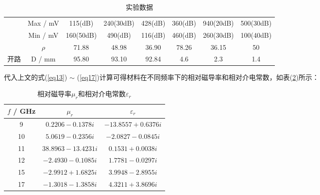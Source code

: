 \documentclass[a4paper]{article}
\begin{document}
\begin{table}[!h]
\begin{tabular}{|c|c|c|c|c|c|c|c|}
		                                                              & Max / mV                       & 115(dB)                       & 240(30dB)                     & 428(dB)                       & 360(dB)                       & 940(20dB)                     & 500(30dB)                   \\ \cline{2-8}
		                                                              & Min / mV                       & 160(50dB)                     & 490(dB)                       & 116(dB)                       & 460(dB)                       & 260(30dB)                     & 100(40dB)                   \\ \cline{2-8}
		                                                              & \cellcolor[HTML]{EFEFEF}$\rho$ & \cellcolor[HTML]{EFEFEF}71.88 & \cellcolor[HTML]{EFEFEF}48.98 & \cellcolor[HTML]{EFEFEF}36.90 & \cellcolor[HTML]{EFEFEF}78.26 & \cellcolor[HTML]{EFEFEF}36.15 & \cellcolor[HTML]{EFEFEF}50  \\ \cline{2-8}
		\multirow{-4}{*}{开路}                                        & \cellcolor[HTML]{EFEFEF}D / mm & \cellcolor[HTML]{EFEFEF}95.80 & \cellcolor[HTML]{EFEFEF}93.10 & \cellcolor[HTML]{EFEFEF}92.84 & \cellcolor[HTML]{EFEFEF}4.6   & \cellcolor[HTML]{EFEFEF}2.3   & \cellcolor[HTML]{EFEFEF}1.4 \\ \hline
	\end{tabular}
	\caption{实验数据}\label{table1:data}
\end{table}

代入上文的式(\ref{eq13}) $\sim$ (\ref{eq17})计算可得材料在不同频率下的相对磁导率和相对介电常数，如表(\ref{table2:mu_r and epsilon_r})所示：
\begin{table}[!h]
	\centering
	\begin{tabular}{|c|c|c|}
		\hline
		$f$ / GHz & $\mu_r$             & $\varepsilon_r$     \\ \hline
		9         & $0.2206-0.1378 i$   & $-13.8557+0.6376 i$ \\ \hline
		10        & $5.0619-0.2356 i$   & $-2.0827-0.0845 i$  \\ \hline
		11        & $38.8963-13.4231 i$ & $0.1531+0.0038 i$   \\ \hline
		12        & $-2.4930-0.1085 i$  & $1.7781-0.0297 i$   \\ \hline
		15        & $-2.9912+1.6825 i$  & $3.9948-2.8955 i$   \\ \hline
		17        & $-1.3018-1.3858 i$  & $4.3211+3.8696 i$   \\ \hline
	\end{tabular}
	\caption{相对磁导率$\mu_r$和相对介电常数$\varepsilon_r$}\label{table2:mu_r and epsilon_r}
\end{table}
\end{document}
